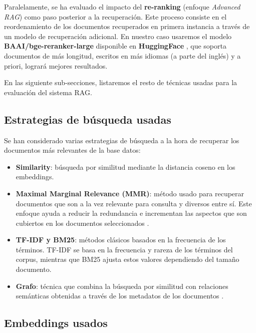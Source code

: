         \noindent Paralelamente, se ha evaluado el impacto del \textbf{re-ranking} (enfoque \textit{Advanced RAG}) \cite{gao2024retrievalaugmentedgenerationlargelanguage} como paso posterior a la recuperación. Este proceso consiste en el reordenamiento de los documentos recuperados en primera instancia a través de un modelo de recuperación adicional. En nuestro caso usaremos el modelo \textbf{BAAI/bge-reranker-large} disponible en \textbf{HuggingFace} \cite{0036_bge_reranker}, que soporta documentos de más longitud, escritos en más idiomas (a parte del inglés) y a priori, logrará mejores resultados.

        \noindent En las siguiente sub-secciones, listaremos el resto de técnicas usadas para la evaluación del sistema RAG.

        \subsection{Estrategias de búsqueda usadas}

            Se han considerado varias estrategias de búsqueda a la hora de recuperar los documentos más relevantes de la base datos:
    
            \begin{itemize}
                \item \textbf{Similarity}: búsqueda por similitud mediante la distancia coseno en los embeddings.
                \item \textbf{Maximal Marginal Relevance (MMR)}: método usado para recuperar documentos que son a la vez relevante para consulta y diversos entre sí. Este enfoque ayuda a reducir la redundancia e incrementan las aspectos que son cubiertos en los documentos seleccionados \cite{0023_mmr}.
                \item \textbf{TF-IDF y BM25}: métodos clásicos basados en la frecuencia de los términos. TF-IDF se basa en la frecuencia y rareza de los términos del corpus, mientras que BM25 ajusta estos valores dependiendo del tamaño documento.
                \item \textbf{Grafo}: técnica que combina la búsqueda por similitud con relaciones semánticas obtenidas a través de los metadatos de los documentos \cite{peng2024graphretrievalaugmentedgenerationsurvey}. 
            \end{itemize}

        \subsection{Embeddings usados}

